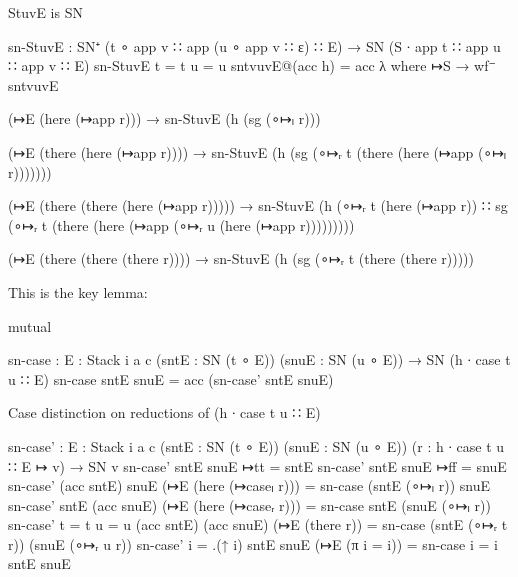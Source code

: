 StuvE is SN

\begin{code}
sn-StuvE : SN⁺ (t ∘ app v ∷ app (u ∘ app v ∷ ε) ∷ E)
          → SN (S ∙ app t ∷ app u ∷ app v ∷ E)
sn-StuvE {t = t} {u = u} sntvuvE@(acc h) = acc λ where
  ↦S →
    wf⁻ sntvuvE

  (↦E (here (↦app r))) →
    sn-StuvE (h (sg (∘↦ₗ r)))

  (↦E (there (here (↦app r)))) →
    sn-StuvE (h (sg (∘↦ᵣ t (there (here (↦app (∘↦ₗ r)))))))

  (↦E (there (there (here (↦app r))))) →
    sn-StuvE (h (∘↦ᵣ t (here (↦app r)) ∷
                 sg (∘↦ᵣ t (there (here (↦app (∘↦ᵣ u (here (↦app r)))))))))

  (↦E (there (there (there r)))) →
    sn-StuvE (h (sg (∘↦ᵣ t (there (there r)))))
\end{code}

This is the key lemma:

\begin{code}
mutual

  sn-case : {E : Stack i a c} (sntE : SN (t ∘ E)) (snuE : SN (u ∘ E)) → SN (h ∙ case t u ∷ E)
  sn-case sntE snuE = acc (sn-case' sntE snuE)
\end{code}

  Case distinction on reductions of (h ∙ case t u ∷ E)

\begin{code}
  sn-case' : {E : Stack i a c}
            (sntE : SN (t ∘ E))
            (snuE : SN (u ∘ E))
            (r : h ∙ case t u ∷ E ↦ v) → SN v
  sn-case'  sntE snuE ↦tt = sntE
  sn-case'  sntE snuE ↦ff = snuE
  sn-case'  (acc sntE) snuE (↦E (here (↦caseₗ r)))   = sn-case (sntE (∘↦ₗ r)) snuE
  sn-case'  sntE (acc snuE) (↦E (here (↦caseᵣ r)))   = sn-case sntE (snuE (∘↦ₗ r))
  sn-case'  {t = t} {u = u}
            (acc sntE) (acc snuE) (↦E (there r))     = sn-case (sntE (∘↦ᵣ t r)) (snuE (∘↦ᵣ u r))
  sn-case'  {i = .(↑ i)} sntE snuE (↦E (π {i = i}))  = sn-case {i = i} sntE snuE
\end{code}


